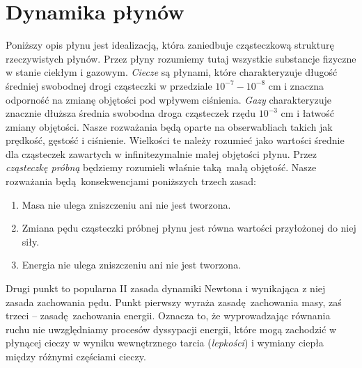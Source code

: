 \section{Dynamika płynów}

Poniższy opis płynu jest idealizacją, która zaniedbuje cząsteczkową strukturę rzeczywistych płynów. Przez płyny rozumiemy tutaj wszystkie substancje fizyczne w stanie ciekłym i gazowym. \emph{Ciecze} są płynami, które charakteryzuje długość średniej swobodnej drogi cząsteczki w przedziale \(10^{-7} - 10^{-8}\) cm i znaczna odporność na zmianę objętości pod wpływem ciśnienia. \emph{Gazy} charakteryzuje znacznie dłuższa średnia swobodna droga cząsteczek rzędu \(10^{-3}\) cm i łatwość zmiany objętości. Nasze rozważania będą oparte na obserwabliach takich jak prędkość, gęstość i ciśnienie. Wielkości te należy rozumieć jako wartości średnie dla cząsteczek zawartych w infinitezymalnie małej objętości płynu. Przez \emph{cząsteczkę próbną} będziemy rozumieli właśnie taką małą objętość. Nasze rozważania będą konsekwencjami poniższych trzech zasad:
\begin{enumerate}
    \item Masa nie ulega zniszczeniu ani nie jest tworzona.
    \item Zmiana pędu cząsteczki próbnej płynu jest równa wartości przyłożonej do niej siły.
    \item Energia nie ulega zniszczeniu ani nie jest tworzona. 
\end{enumerate}
Drugi punkt to popularna II zasada dynamiki Newtona i wynikająca z niej zasada zachowania pędu. Punkt pierwszy wyraża zasadę zachowania masy, zaś trzeci – zasadę zachowania energii. Oznacza to, że wyprowadzając równania ruchu nie uwzględniamy procesów dyssypacji energii, które mogą zachodzić w płynącej cieczy w wyniku wewnętrznego tarcia (\emph{lepkości}) i wymiany ciepła między różnymi częściami cieczy.


